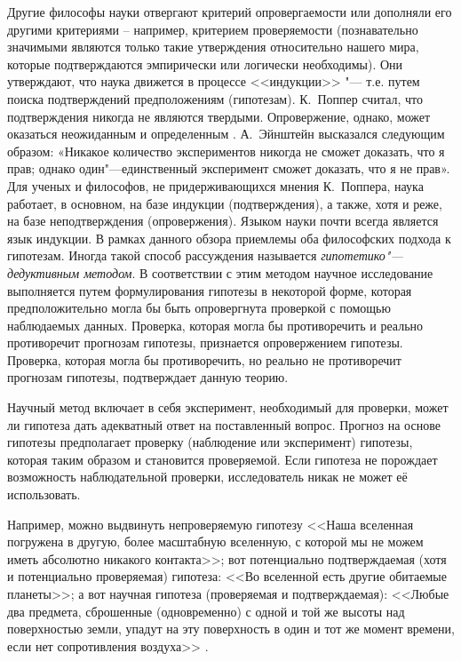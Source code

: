 Другие философы науки отвергают критерий опровергаемости или дополняли его другими критериями – например, критерием 
проверяемости (познавательно значимыми являются только такие утверждения относительно нашего мира, которые 
подтверждаются эмпирически или логически необходимы). Они утверждают, что наука движется в процессе 
<<индукции>> "--- т.е. путем поиска подтверждений предположениям (гипотезам). К.~Поппер считал, что подтверждения 
никогда не являются твердыми. Опровержение, однако, может оказаться неожиданным и определенным \cite{Popper2005}. 
А.~Эйнштейн высказался следующим образом: «Никакое количество экспериментов никогда не сможет доказать, что я прав; 
однако один"---единственный эксперимент сможет доказать, что я не прав». Для ученых и философов, не придерживающихся 
мнения К.~Поппера, наука работает, в основном, на базе индукции (подтверждения), а также, хотя и реже, на базе 
неподтверждения (опровержения). Языком науки почти всегда является язык индукции. В рамках данного обзора приемлемы 
оба философских подхода к гипотезам. Иногда такой способ рассуждения называется 
\textit{гипотетико"---дедуктивным методом}. В соответствии с этим методом научное исследование выполняется путем 
формулирования гипотезы в некоторой форме, которая предположительно могла бы быть опровергнута проверкой с помощью 
наблюдаемых данных. Проверка, которая могла бы противоречить и реально противоречит прогнозам гипотезы, признается 
опровержением гипотезы. Проверка, которая могла бы противоречить, но реально не противоречит прогнозам гипотезы, 
подтверждает данную теорию.

Научный метод включает в себя эксперимент, необходимый для проверки, может ли гипотеза дать адекватный ответ на 
поставленный вопрос. Прогноз на основе гипотезы предполагает проверку (наблюдение или эксперимент) гипотезы, которая 
таким образом и становится проверяемой. Если гипотеза не порождает возможность наблюдательной проверки, исследователь 
никак не может её использовать.

Например, можно выдвинуть непроверяемую гипотезу <<Наша вселенная погружена в другую, более масштабную вселенную, с 
которой мы не можем иметь абсолютно никакого контакта>>; вот потенциально подтверждаемая (хотя и потенциально 
проверяемая) гипотеза: <<Во вселенной есть другие обитаемые планеты>>; а вот научная гипотеза (проверяемая и 
подтверждаемая): <<Любые два предмета, сброшенные (одновременно) с одной и той же высоты над поверхностью земли, 
упадут на эту поверхность в один и тот же момент времени, если нет сопротивления воздуха>> \cite{Stanbrough2022}.

